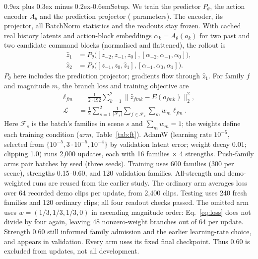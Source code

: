 \documentclass[10pt,twocolumn,a4paper]{article}
\makeatletter
\renewcommand\paragraph{\@startsection{paragraph}{4}{\z@}%
  {0.9ex plus 0.3ex minus 0.2ex}{-0.6em}{\normalfont\normalsize\bfseries}}
\makeatother
\begin{document}
\paragraph{Setup.} We train the predictor $P_\theta$, the action encoder $A_\theta$ and the
prediction projector (\ftParameters{} parameters). The encoder, its projector, all
BatchNorm statistics and the readouts stay frozen. With cached real history latents and
action-block embeddings $\alpha_k=A_\theta(a_k)$ for two past and two candidate command
blocks (normalised and flattened), the rollout is
\begin{equation}\label{eq:rollout}
\begin{aligned}
\hat z_1 &= P_\theta\big([z_{-2},z_{-1},z_0],[\alpha_{-2},\alpha_{-1},\alpha_0]\big),\\
\hat z_2 &= P_\theta\big([z_{-1},z_0,\hat z_1],[\alpha_{-1},\alpha_0,\alpha_1]\big).
\end{aligned}
\end{equation}
$P_\theta$ here includes the prediction projector; gradients flow through $\hat z_1$.
For family $f$ and magnitude $m$, the branch loss and training objective are
\begin{equation}\label{eq:loss}
\begin{aligned}
\ell_{fm}&=\frac{1}{2\cdot192}\sum_{k=1}^2\lVert\hat z_{fmk}-E(o_{fmk})\rVert_2^2,\\
\mathcal L&=\frac{1}{2}\sum_{s=1}^2\frac{1}{|\mathcal F_s|}
\sum_{f\in\mathcal F_s}\sum_m w_m\ell_{fm}.
\end{aligned}
\end{equation}
Here $\mathcal F_s$ is the batch's families in scene $s$ and $\sum_m w_m=1$;
the weights define each training condition (\emph{arm}, Table~\ref{tab:ft}). AdamW (learning
rate $10^{-5}$, selected from $\{10^{-5},3{\cdot}10^{-5},10^{-4}\}$ by validation latent
error; weight decay 0.01; clipping 1.0) runs 2,000 updates, each with 16 families
$\times$ 4 strengths. Push-family arms pair batches by seed (three seeds). Training uses 600 families
(300 per scene), strengths 0.15--0.60, and 120 validation families. All-strength and
demo-weighted runs are reused from the earlier study. The ordinary arm averages loss
over 64 recorded demo clips per update, from 2,400 clips. Testing uses 240 fresh
families and 120 ordinary clips; all four readout checks passed. The omitted arm uses
$w=(1/3,1/3,1/3,0)$ in ascending magnitude order: Eq.~\ref{eq:loss} does not divide by
four again, leaving 48 nonzero-weight branches out of 64 per update. Strength
0.60 still informed family admission and the earlier learning-rate
choice, and appears in validation. Every arm uses its fixed final checkpoint.
Thus 0.60 is excluded from updates, not all development.
\end{document}
